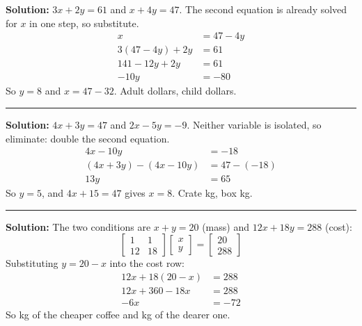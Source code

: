 \documentclass[12pt]{article}
\begin{document}




\textbf{Solution:} $3x + 2y = 61$ and $x + 4y = 47$. The second equation is already solved
for $x$ in one step, so substitute.
\begin{align*}
  x &= 47 - 4y \\
  3(47 - 4y) + 2y &= 61 \\
  141 - 12y + 2y &= 61 \\
  -10y &= -80
\end{align*}
So $y = 8$ and $x = 47 - 32$. Adult  dollars, child  dollars.

\vspace{0.2cm}\noindent\rule{\linewidth}{0.2pt}


\textbf{Solution:} $4x + 3y = 47$ and $2x - 5y = -9$. Neither variable is isolated, so
eliminate: double the second equation.
\begin{align*}
  4x - 10y &= -18 \\
  (4x + 3y) - (4x - 10y) &= 47 - (-18) \\
  13y &= 65
\end{align*}
So $y = 5$, and $4x + 15 = 47$ gives $x = 8$. Crate  kg, box  kg.

\vspace{0.2cm}\noindent\rule{\linewidth}{0.2pt}


\textbf{Solution:} The two conditions are $x + y = 20$ (mass) and $12x + 18y = 288$ (cost):
\[ \begin{bmatrix} 1 & 1 \\ 12 & 18 \end{bmatrix}
   \begin{bmatrix} x \\ y \end{bmatrix} = \begin{bmatrix} 20 \\ 288 \end{bmatrix} \]
Substituting $y = 20 - x$ into the cost row:
\begin{align*}
  12x + 18(20 - x) &= 288 \\
  12x + 360 - 18x &= 288 \\
  -6x &= -72
\end{align*}
So  kg of the cheaper coffee and  kg of the dearer one.
\end{document}
